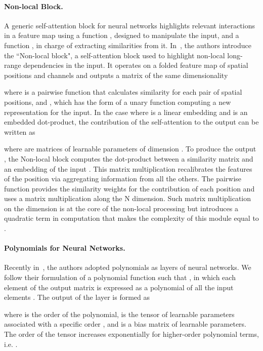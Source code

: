 \documentclass[10pt,twocolumn,letterpaper]{article}
\begin{document}
\paragraph{Non-local Block.}{A generic self-attention block for neural networks highlights relevant interactions in a feature map using a function , designed to manipulate the input, and a function , in charge of extracting similarities from it. In~\cite{wang2018non}, the authors introduce the ``Non-local block", a self-attention block used to highlight non-local long-range dependencies in the input. It operates on a folded feature map  of  spatial positions and  channels and outputs a matrix  of the same dimensionality 

  where   is a pairwise function that calculates similarity for each pair of spatial positions, and , which has the form of a unary function computing a new representation for the input. In the case where  is a linear embedding and  is an embedded dot-product, the contribution of the self-attention to the output can be written as

where  are matrices of learnable parameters of dimension .
To produce the output , the Non-local block computes the dot-product between a similarity matrix  and an embedding of the input . This matrix multiplication recalibrates the features of the  position via aggregating information from all the others. The pairwise function provides the similarity weights for the contribution of each position and uses a matrix multiplication along the N dimension. 
Such matrix multiplication on the  dimension is at the core of the non-local processing but introduces a quadratic term in computation that makes the complexity of this module equal to .}
\vspace{-0.1cm}
\paragraph{Polynomials for Neural Networks.}{ Recently in~\cite{chrysos2020p}, the authors adopted polynomials as layers of neural networks. We follow their formulation of a polynomial function  such that , in which each element of the output matrix is expressed as a polynomial of all the input elements . The output of the layer is formed as

where  is the order of the polynomial,  is the tensor of learnable parameters associated with a specific order , and  is a bias matrix of learnable parameters. The order of the tensor  increases exponentially for higher-order polynomial terms, i.e. .} 
\end{document}
